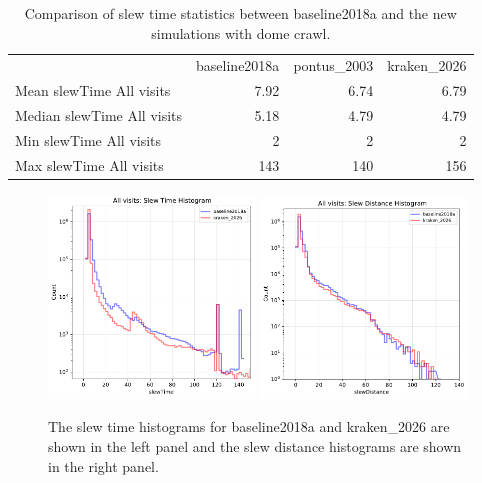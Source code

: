 \documentclass[DM,authoryear,toc]{lsstdoc}
\begin{document}
\begin{table}[htp]
\caption{Comparison of slew time statistics between baseline2018a and the new simulations with dome crawl.}
\begin{center}
\vskip 0.2in
\small
\begin{tabular}{lrrr}
\toprule
{}                                         &   baseline2018a  &   pontus\_2003  &  kraken\_2026 \\
 Mean slewTime All visits    &           7.92          &         6.74          & 6.79               \\
 Median slewTime All visits &          5.18           &        4.79           & 4.79               \\
 Min slewTime All visits       &           2               &         2               & 2                     \\
 Max slewTime All visits      &         143             &       140             & 156                 \\

\bottomrule
\end{tabular}
\end{center}
\label{tab:slewtime-comparison}
\end{table}

\begin{figure}[ht]
\centering
\includegraphics[width=0.49\textwidth]{figures/kraken_2026_baseline2018a_Slew_Time_Histogram_All_visits_ONED_ComboBinnedData.pdf}
\includegraphics[width=0.49\textwidth]{figures/kraken_2026_baseline2018a_Slew_Distance_Histogram_All_visits_ONED_ComboBinnedData.pdf}
\caption{The slew time histograms for baseline2018a and kraken\_2026 are shown in the left panel and
the slew distance histograms are shown in the right panel.}
\label{fig:slew_diff}
\end{figure}
\end{document}
